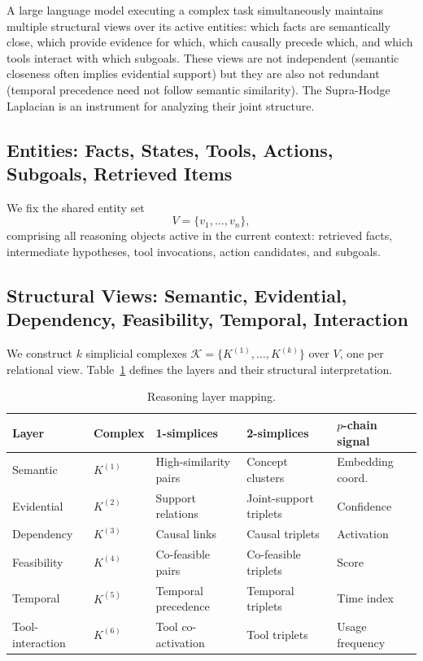 \documentclass[11pt]{article}
\theoremstyle{definition}
\theoremstyle{remark}
\newcommand{\calK}{\mathcal{K}}
\begin{document}
A large language model executing a complex task simultaneously maintains
multiple structural views over its active entities: which facts are semantically
close, which provide evidence for which, which causally precede which, and
which tools interact with which subgoals. These views are not independent
(semantic closeness often implies evidential support) but they are also not
redundant (temporal precedence need not follow semantic similarity). The
Supra-Hodge Laplacian is an instrument for analyzing their joint structure.

\subsection{Entities: Facts, States, Tools, Actions, Subgoals, Retrieved Items}

We fix the shared entity set
\[
  V = \{v_1,\dots,v_n\},
\]
comprising all reasoning objects active in the current context: retrieved facts,
intermediate hypotheses, tool invocations, action candidates, and subgoals.

\subsection{Structural Views: Semantic, Evidential, Dependency, Feasibility, Temporal, Interaction}

We construct $k$ simplicial complexes $\calK = \{K^{(1)},\dots,K^{(k)}\}$
over $V$, one per relational view. Table~\ref{tab:layers} defines the layers
and their structural interpretation.

\begin{table}[h]
\centering
\caption{Reasoning layer mapping.}
\label{tab:layers}
\begin{tabular}{lllll}
\toprule
Layer & Complex & 1-simplices & 2-simplices & $p$-chain signal\\
\midrule
Semantic & $K^{(1)}$ & High-similarity pairs & Concept clusters & Embedding coord.\\
Evidential & $K^{(2)}$ & Support relations & Joint-support triplets & Confidence\\
Dependency & $K^{(3)}$ & Causal links & Causal triplets & Activation\\
Feasibility & $K^{(4)}$ & Co-feasible pairs & Co-feasible triplets & Score\\
Temporal & $K^{(5)}$ & Temporal precedence & Temporal triplets & Time index\\
Tool-interaction & $K^{(6)}$ & Tool co-activation & Tool triplets & Usage frequency\\
\bottomrule
\end{tabular}
\end{table}
\end{document}
